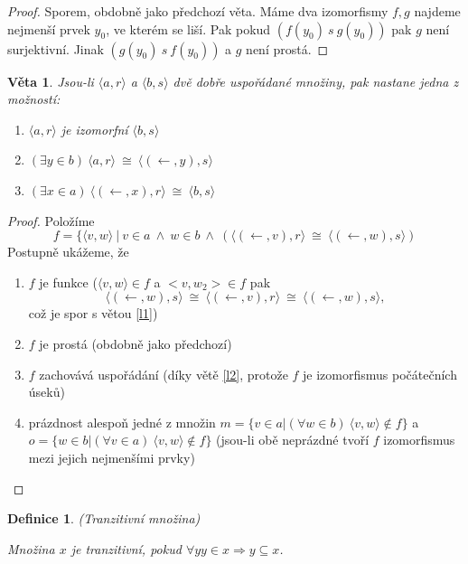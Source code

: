 \documentclass[a4paper,10pt,titlepage]{article} \usepackage[utf8]{inputenc}
\newtheorem{theorem}{Věta}
\newtheorem{define}{Definice}
\begin{document}
\begin{proof}
Sporem, obdobně jako předchozí věta. Máme dva izomorfismy $f,g$ najdeme nejmenší prvek $y_0$, ve kterém se liší.
Pak pokud $(f(y_0)\ s\ g(y_0))$ pak $g$ není surjektivní. Jinak $(g(y_0)\ s\ f(y_0))$ a $g$ není prostá.
\end{proof}

\begin{theorem}
Jsou-li $\langle a , r \rangle $ a $\langle b , s \rangle $ dvě dobře uspořádané množiny, pak nastane jedna z možností:
\begin{enumerate}
\item  $\langle a , r \rangle $ je izomorfní $\langle b , s \rangle $ 
\item  $(\exists y \in b)\ \langle a , r \rangle  \ \cong \ \langle (\leftarrow , y),s \rangle$ 
\item  $(\exists x \in a)\ \langle (\leftarrow , x),r \rangle \ \cong \ \langle b , s \rangle $ 
\end{enumerate}
\end{theorem}

\begin{proof}
Položíme 
\[
	f = \{\langle v , w \rangle \ | \ v \in a\ \wedge \ w \in b\ \wedge \ (\langle (\leftarrow ,v), r\rangle \ \cong \ \langle (\leftarrow , w),s \rangle)
\]
Postupně ukážeme, že
\begin{enumerate}
\item $f$ je funkce	($\langle v , w \rangle  \in f$ a $<v,w_2> \in f$ pak 
\[
	\langle(\leftarrow , w), s\rangle\ \cong \ \langle(\leftarrow , v), r\rangle \ \cong \ \langle(\leftarrow , w), s\rangle,
\]
což je spor s větou \ref{l1})
\item $f$ je prostá (obdobně jako předchozí)
\item $f$ zachovává uspořádání (díky větě \ref{l2}, protože $f$ je izomorfismus počátečních úseků)
\item prázdnost alespoň jedné z množin
$ m = \{v \in a | (\forall w \in b) \ \langle v , w \rangle  \notin f\}$
a \\$o = \{w \in b | (\forall v \in a) \ \langle v , w \rangle  \notin f\}$
(jsou-li obě neprázdné tvoří $f$ izomorfismus mezi jejich nejmenšími prvky)
\end{enumerate}
\end{proof}


\begin{define}
(Tranzitivní množina)

Množina $x$ je tranzitivní, pokud $\forall y  y \in x \Rightarrow y \subseteq x$. 
\end{define}
\end{document}
